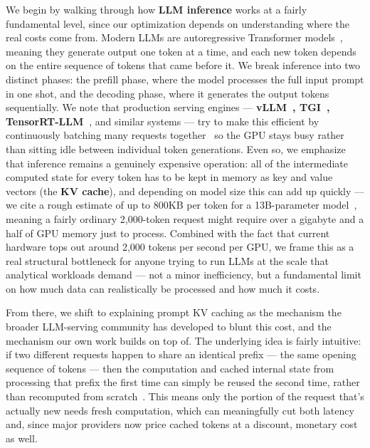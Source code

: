 \documentclass[manuscript,review]{acmart}
\begin{document}
We begin by walking through how \textbf{LLM inference} works at a fairly fundamental level, since our optimization depends on understanding where the real costs come from. Modern LLMs are autoregressive Transformer models~\cite{vaswani2023attention}, meaning they generate output one token at a time, and each new token depends on the entire sequence of tokens that came before it. We break inference into two distinct phases: the prefill phase, where the model processes the full input prompt in one shot, and the decoding phase, where it generates the output tokens sequentially. We note that production serving engines — \textbf{ vLLM~\cite{kwon2023vllm}, TGI~\cite{huggingface_tgi}, TensorRT-LLM~\cite{nvidia2023tensorrt}}, and similar systems — try to make this efficient by continuously batching many requests together~\cite{yu2022orca} so the GPU stays busy rather than sitting idle between individual token generations. Even so, we emphasize that inference remains a genuinely expensive operation: all of the intermediate computed state for every token has to be kept in memory as key and value vectors (the \textbf{KV cache}), and depending on model size this can add up quickly — we cite a rough estimate of up to 800KB per token for a 13B-parameter model~\cite{kwon2023vllm}, meaning a fairly ordinary 2,000-token request might require over a gigabyte and a half of GPU memory just to process. Combined with the fact that current hardware tops out around 2,000 tokens per second per GPU, we frame this as a real structural bottleneck for anyone trying to run LLMs at the scale that analytical workloads demand — not a minor inefficiency, but a fundamental limit on how much data can realistically be processed and how much it costs.

From there, we shift to explaining prompt KV caching as the mechanism the broader LLM-serving community has developed to blunt this cost, and the mechanism our own work builds on top of. The underlying idea is fairly intuitive: if two different requests happen to share an identical prefix — the same opening sequence of tokens — then the computation and cached internal state from processing that prefix the first time can simply be reused the second time, rather than recomputed from scratch~\cite{zheng2023sglang}. This means only the portion of the request that's actually new needs fresh computation, which can meaningfully cut both latency and, since major providers now price cached tokens at a discount, monetary cost as well.
\end{document}
